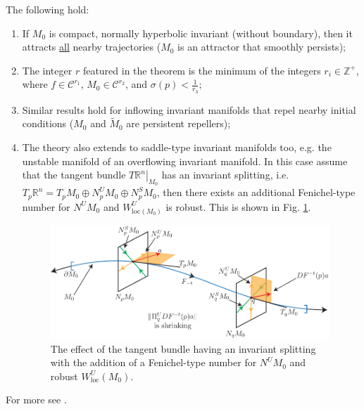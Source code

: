 \begin{remark}[]
	The following hold:
	\begin{enumerate}
		\item If $M_0$ is compact, normally hyperbolic invariant (without boundary), then it attracts \underline{all} nearby trajectories ($M_0$ is an attractor that smoothly persists);
		\item The integer $r$ featured in the theorem is the minimum of the integers $r_i\in \mathbb{Z}^{+}$, where $f \in \mathcal{C}^{r_1}$, $M_0 \in \mathcal{C}^{r_2}$, and $\sigma(p) < \frac{1}{r_3}$;
		\item Similar results hold for inflowing invariant manifolds that repel nearby initial conditions ($M_0$ and $\tilde{M}_{0}$ are persistent repellers);
		\item The theory also extends to saddle-type invariant manifolds too, e.g. the unstable manifold of an overflowing invariant manifold. In this case assume that the tangent bundle $\left.T\mathbb{R}^{n}\right|_{M_0}$ has an invariant splitting, i.e. $T_{p}\mathbb{R}^{n} = T_pM_0 \oplus N_{p}^{U}M_0 \oplus N_{p}^{S}M_0$, then there exists an additional Fenichel-type number for $N^{U}M_0$ and $W^{U}_{ \textrm{loc} (M_0)}$ is robust. This is shown in Fig. \ref{fig:fenichel_thm_rmks}.
		\begin{figure}[h!]
			\centering
			\includegraphics[width=0.99\textwidth]{figures/ch9/16fenichel_thm_rmks.pdf}
			\caption{The effect of the tangent bundle having an invariant splitting with the addition of a Fenichel-type number for $N^{U}M_0$ and robust $W^{U}_{ \textrm{loc} }(M_0)$.}
			\label{fig:fenichel_thm_rmks}
		\end{figure}
	\end{enumerate}
\end{remark}
For more see \cite{Wiggins1994}.

